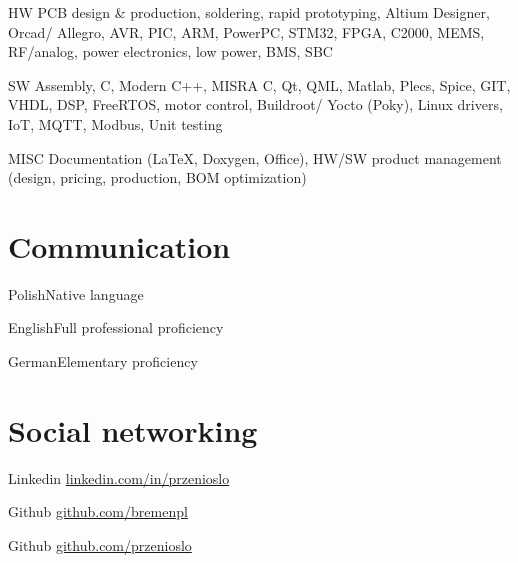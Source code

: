 \documentclass{tccv}
\begin{document}
\begin{factlist}

\item{HW}
     {PCB design \& production, soldering, rapid prototyping, Altium Designer, Orcad/ Allegro, AVR, PIC, ARM, PowerPC, STM32, FPGA, C2000, MEMS, RF/analog, power electronics, low power, BMS, SBC}

\item{SW}
     {Assembly, C, Modern C++, MISRA C, Qt, QML, Matlab, Plecs, Spice, GIT, VHDL, DSP, FreeRTOS, motor control, Buildroot/ Yocto (Poky), Linux drivers, IoT, MQTT, Modbus, Unit testing}
     
\item{MISC}
     {Documentation (\LaTeX, Doxygen, Office), HW/SW product management (design, pricing, production, BOM optimization)}

\end{factlist}

\section{Communication}

\begin{factlist}
\item{Polish}{Native language}
\item{English}{Full professional proficiency}
\item{German}{Elementary proficiency}
\end{factlist}

\section{Social networking}

\begin{factlist}

\item{Linkedin}
     {\href{http://pl.linkedin.com/in/przenioslo}{linkedin.com/in/przenioslo}}
     
\item{Github}
     {\href{http://github.com/bremenpl}{github.com/bremenpl}}
     
\item{Github}
     {\href{http://github.com/przenioslo}{github.com/przenioslo}}

\end{factlist} 

\vspace*{\fill} %
\end{document}
